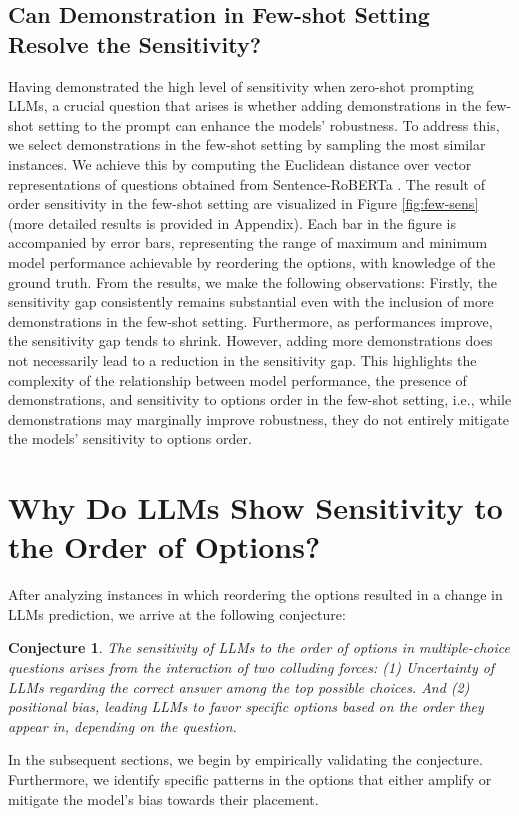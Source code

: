 \documentclass[11pt]{article}
\newtheorem{conjecture}[theorem]{Conjecture}
\begin{document}
\subsection{Can Demonstration in Few-shot Setting Resolve the Sensitivity?}
Having demonstrated the high level of sensitivity when zero-shot prompting LLMs, a crucial question that arises is whether adding demonstrations in the few-shot setting to the prompt can enhance the models' robustness. To address this, we select demonstrations in the few-shot setting by sampling the most similar instances. We achieve this by computing the Euclidean distance over vector representations of questions obtained from Sentence-RoBERTa \citep{reimers2019sentence}. 
The result of order sensitivity in the few-shot setting are visualized in Figure \ref{fig:few-sens} (more detailed results is provided in Appendix). 
Each bar in the figure is accompanied by error bars, representing the range of maximum and minimum model performance achievable by reordering the options, with knowledge of the ground truth. 
From the results, we make the following observations: Firstly, the sensitivity gap consistently remains substantial even with the inclusion of more demonstrations in the few-shot setting. 
Furthermore, as performances improve, the sensitivity gap tends to shrink. 
However, adding more demonstrations does not necessarily lead to a reduction in the sensitivity gap. 
This highlights the complexity of the relationship between model performance, the presence of demonstrations, and sensitivity to options order in the few-shot setting, i.e., while demonstrations may marginally improve robustness, they do not entirely mitigate the models' sensitivity to options order. 

\section{Why Do LLMs Show Sensitivity to the Order of Options?}
After analyzing instances in which reordering the options resulted in a change in LLMs prediction, we arrive at the following conjecture:
\begin{conjecture}
The sensitivity of LLMs to the order of options in multiple-choice questions arises from the interaction of two colluding forces:
(1) Uncertainty of LLMs regarding the correct answer among the top possible choices.
And (2) positional bias, leading LLMs to favor specific options based on the order they appear in, depending on the question.
\end{conjecture}
In the subsequent sections, we begin by empirically validating the conjecture. 
Furthermore, we identify specific patterns in the options that either amplify or mitigate the model's bias towards their placement.
\end{document}
